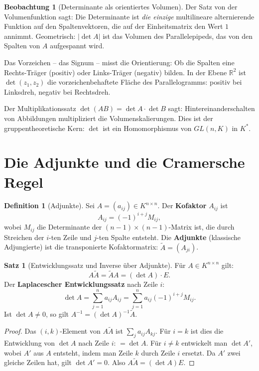 ﻿\documentclass[a4paper,12pt]{report}
\theoremstyle{definition}
\newtheorem{definition}{Definition}
\newtheorem{satz}{Satz}
\newtheorem{beobachtung}{Beobachtung}
\begin{document}
\begin{beobachtung}[Determinante als orientiertes Volumen]
    Der Satz von der Volumenfunktion sagt: Die Determinante ist
    \emph{die einzige} multilineare alternierende Funktion auf den
    Spaltenvektoren, die auf der Einheitsmatrix den Wert $1$ annimmt.
    Geometrisch: $|\det A|$ ist das Volumen des Parallelepipeds, das
    von den Spalten von $A$ aufgespannt wird.

    Das Vorzeichen -- das Signum -- misst die Orientierung: Ob die
    Spalten eine Rechts-Träger (positiv) oder Links-Träger (negativ) bilden.
    In der Ebene $\mathbb{R}^2$ ist $\det(z_1, z_2)$ die vorzeichenbehaftete
    Fläche des Parallelogramms: positiv bei Linksdreh, negativ bei Rechtsdreh.

    Der Multiplikationssatz $\det(AB) = \det A \cdot \det B$ sagt:
    Hintereinanderschalten von Abbildungen multipliziert die Volumenskalierungen.
    Dies ist der gruppentheoretische Kern: $\det$ ist ein Homomorphismus
    von $GL(n, K)$ in $K^*$.
\end{beobachtung}

\section{Die Adjunkte und die Cramersche Regel}

\begin{definition}[Adjunkte]
    Sei $A = (a_{ij}) \in K^{n \times n}$. Der \textbf{Kofaktor} $A_{ij}$ ist
    \[
        A_{ij} = (-1)^{i+j} M_{ij},
    \]
    wobei $M_{ij}$ die Determinante der $(n-1) \times (n-1)$-Matrix ist,
    die durch Streichen der $i$-ten Zeile und $j$-ten Spalte entsteht.
    Die \textbf{Adjunkte} (klassische Adjungierte) ist die transponierte
    Kofaktormatrix: $\tilde{A} = (A_{ji})$.
\end{definition}

\begin{satz}[Entwicklungssatz und Inverse über Adjunkte]
    Für $A \in K^{n \times n}$ gilt:
    \[
        A \tilde{A} = \tilde{A} A = (\det A) \cdot E.
    \]
    Der \textbf{Laplacescher Entwicklungssatz} nach Zeile $i$:
    \[
        \det A = \sum_{j=1}^n a_{ij} A_{ij} = \sum_{j=1}^n a_{ij} (-1)^{i+j} M_{ij}.
    \]
    Ist $\det A \neq 0$, so gilt $A^{-1} = (\det A)^{-1} \tilde{A}$.
\end{satz}
\begin{proof}
    Das $(i,k)$-Element von $A\tilde{A}$ ist $\sum_j a_{ij} A_{kj}$.
    Für $i = k$ ist dies die Entwicklung von $\det A$ nach Zeile $i$: $= \det A$.
    Für $i \neq k$ entwickelt man $\det A'$, wobei $A'$ aus $A$ entsteht,
    indem man Zeile $k$ durch Zeile $i$ ersetzt. Da $A'$ zwei gleiche
    Zeilen hat, gilt $\det A' = 0$. Also $A\tilde{A} = (\det A) E$.
\end{proof}
\end{document}
